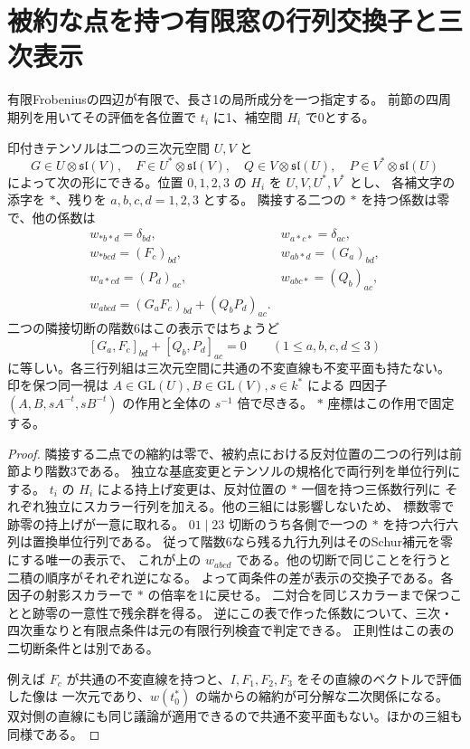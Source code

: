 \section{被約な点を持つ有限窓の行列交換子と三次表示}
\label{sec:marked-point-commutators}
有限Frobeniusの四辺が有限で、長さ1の局所成分を一つ指定する。
前節の四周期列を用いてその評価を各位置で $t_i$ に1、補空間 $H_i$ で0とする。
\begin{theorem}\label{thm:marked-point-commutators}
印付きテンソルは二つの三次元空間 $U,V$ と
\[
 G\in U\otimes\mathfrak{sl}(V),\quad F\in U^*\otimes\mathfrak{sl}(V),\quad
 Q\in V\otimes\mathfrak{sl}(U),\quad P\in V^*\otimes\mathfrak{sl}(U)
\]
によって次の形にできる。位置 $0,1,2,3$ の $H_i$ を $U,V,U^*,V^*$ とし、
各補文字の添字を $*$、残りを $a,b,c,d=1,2,3$ とする。
隣接する二つの $*$ を持つ係数は零で、他の係数は
\[
\begin{array}{ll}
 w_{*b*d}=\delta_{bd},&w_{a*c*}=\delta_{ac},\\
 w_{*bcd}=(F_c)_{bd},& w_{ab*d}=(G_a)_{bd},\\
 w_{a*cd}=(P_d)_{ac},& w_{abc*}=(Q_b)_{ac},\\
 w_{abcd}=(G_a F_c)_{bd}+(Q_b P_d)_{ac}.&
\end{array}
\]
二つの隣接切断の階数6はこの表示ではちょうど
\[
 [G_a,F_c]_{bd}+[Q_b,P_d]_{ac}=0\qquad(1\le a,b,c,d\le3)
\]
に等しい。各三行列組は三次元空間に共通の不変直線も不変平面も持たない。
印を保つ同一視は $A\in\mathrm{GL}(U), B\in\mathrm{GL}(V), s\in k^*$ による
四因子 $(A,B,s A^{-t},s B^{-t})$ の作用と全体の $s^{-1}$ 倍で尽きる。
$*$ 座標はこの作用で固定する。
\end{theorem}
\begin{proof}
隣接する二点での縮約は零で、被約点における反対位置の二つの行列は前節より階数3である。
独立な基底変更とテンソルの規格化で両行列を単位行列にする。
$t_i$ の $H_i$ による持上げ変更は、反対位置の $*$ 一個を持つ三係数行列に
それぞれ独立にスカラー行列を加える。他の三組には影響しないため、
標数零で跡零の持上げが一意に取れる。
$01\mid23$ 切断のうち各側で一つの $*$ を持つ六行六列は置換単位行列である。
従って階数6なら残る九行九列はそのSchur補元を零にする唯一の表示で、
これが上の $w_{abcd}$ である。他の切断で同じことを行うと二積の順序がそれぞれ逆になる。
よって両条件の差が表示の交換子である。各因子の射影スカラーで $*$ の倍率を1に戻せる。
二対合を同じスカラーまで保つことと跡零の一意性で残余群を得る。
逆にこの表で作った係数について、三次・四次重なりと有限点条件は元の有限行列検査で判定できる。
正則性はこの表の二切断条件とは別である。

例えば $F_c$ が共通の不変直線を持つと、$I,F_1,F_2,F_3$ をその直線のベクトルで評価した像は
一次元であり、$w(t_0^*)$ の端からの縮約が可分解な二次関係になる。
双対側の直線にも同じ議論が適用できるので共通不変平面もない。ほかの三組も同様である。
\end{proof}

